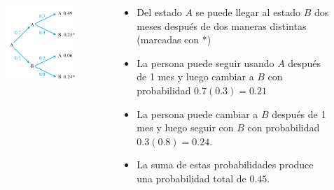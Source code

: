 {\begin{frame}
	\vspace{1mm}
	\begin{columns}[c]
		\begin{column}{0.2\textwidth}			
			\begin{figure}
				\centering
				\includegraphics[width=1.5\textwidth]{imagenes/arbol}
			\end{figure}
			\vspace{1mm}
			
		\end{column}
		\hspace{3mm}
		\begin{column}{0.78\textwidth}
			\begin{itemize}
				\item Del estado $A$ se puede llegar al estado $B$ dos meses después de dos maneras
				distintas (marcadas con *)
				
				\vspace{3mm}
				\item La persona puede seguir usando $A$ después de 1 mes y luego cambiar a $B$ con probabilidad $0.7(0.3)= 0.21$
				
				\vspace{3mm}
				\item La persona puede cambiar a $B$ después de 1 mes y luego seguir con $B$ con probabilidad $0.3(0.8) = 0.24$.
				
				\vspace{3mm}
				\item La suma de estas probabilidades produce una probabilidad total de {\color{red}$0.45$}.
			\end{itemize}
		\end{column}
	\end{columns}
	
\end{frame}
}


